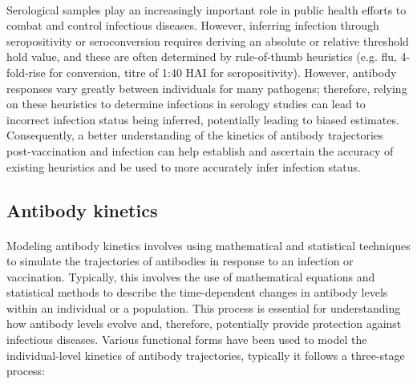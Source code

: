\paragraph{}Serological samples play an increasingly important role in public health efforts to combat and control infectious diseases.\cite{Haselbeck2022;Metcalfe2015} However, inferring infection through seropositivity or seroconversion requires deriving an absolute or relative threshold hold value, and these are often determined by rule-of-thumb heuristics (e.g. flu, 4-fold-rise for conversion, titre of 1:40 HAI for seropositivity).\cite{Xu2020} However, antibody responses vary greatly between individuals for many pathogens; therefore, relying on these heuristics to determine infections in serology studies can lead to incorrect infection status being inferred, potentially leading to biased estimates.\cite{Chan2021;Cauchesmez2021} Consequently, a better understanding of the kinetics of antibody trajectories post-vaccination and infection can help establish and ascertain the accuracy of existing heuristics and be used to more accurately infer infection status.

\subsection{Antibody kinetics}

\paragraph{}Modeling antibody kinetics involves using mathematical and statistical techniques to simulate the trajectories of antibodies in response to an infection or vaccination. \cite{Hay2023} Typically, this involves the use of mathematical equations and statistical methods to describe the time-dependent changes in antibody levels within an individual or a population. This process is essential for understanding how antibody levels evolve and, therefore, potentially provide protection against infectious diseases. Various functional forms have been used to model the individual-level kinetics of antibody trajectories,\cite{} typically it follows a three-stage process:

